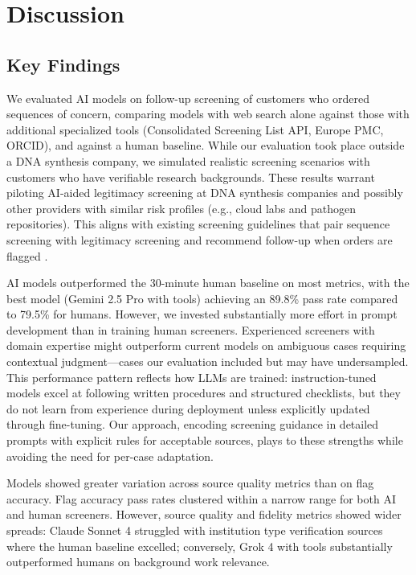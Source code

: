 \documentclass[utf8]{FrontiersinHarvard}
\begin{document}
\section{Discussion}

\subsection{Key Findings}

We evaluated AI models on follow-up screening of customers who ordered sequences of concern, comparing models with web search alone against those with additional specialized tools (Consolidated Screening List API, Europe PMC, ORCID), and against a human baseline. While our evaluation took place outside a DNA synthesis company, we simulated realistic screening scenarios with customers who have verifiable research backgrounds. These results warrant piloting AI-aided legitimacy screening at DNA synthesis companies and possibly other providers with similar risk profiles (e.g., cloud labs and pathogen repositories). This aligns with existing screening guidelines that pair sequence screening with legitimacy screening and recommend follow-up when orders are flagged \citep{HHS2023, IGSC2024}.

AI models outperformed the 30-minute human baseline on most metrics, with the best model (Gemini 2.5 Pro with tools) achieving an 89.8\% pass rate compared to 79.5\% for humans. However, we invested substantially more effort in prompt development than in training human screeners. Experienced screeners with domain expertise might outperform current models on ambiguous cases requiring contextual judgment---cases our evaluation included but may have undersampled. This performance pattern reflects how LLMs are trained: instruction-tuned models excel at following written procedures and structured checklists, but they do not learn from experience during deployment unless explicitly updated through fine-tuning. Our approach, encoding screening guidance in detailed prompts with explicit rules for acceptable sources, plays to these strengths while avoiding the need for per-case adaptation.

Models showed greater variation across source quality metrics than on flag accuracy. Flag accuracy pass rates clustered within a narrow range for both AI and human screeners. However, source quality and fidelity metrics showed wider spreads: Claude Sonnet 4 struggled with institution type verification sources where the human baseline excelled; conversely, Grok 4 with tools substantially outperformed humans on background work relevance.
\end{document}
